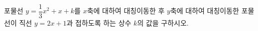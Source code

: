 포물선 $y=\dfrac{1}{3}x^2+x+k$를 $x$축에 대하여 대칭이동한 후 $y$축에 대하여 대칭이동한 포물선이 직선 $y=2x+1$과 접하도록 하는 상수 $k$의 값을 구하시오.
